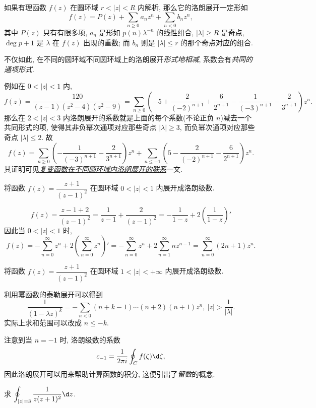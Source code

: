 如果有理函数 $f(z)$ 在圆环域 $r<|z|<R$ 内解析, 那么它的洛朗展开一定形如
\[f(z)=P(z)+\sum_{n\ge 0}a_n z^n+\sum_{n<0}b_n z^n,\]
其中 $P(z)$ 只有有限多项, 
$a_n$ 是形如 $p(n)\lambda^{-n}$ 的线性组合, $|\lambda|\ge R$ 是奇点, $\deg p+1$ 是 $\lambda$ 在 $f(z)$ 出现的重数; 而 $b_n$ 则是 $|\lambda|\le r$ 的那个奇点对应的组合.

不仅如此, 在不同的圆环域不同圆环域上的洛朗展开{\itshape 形式地相减}, 系数会有\emph{共同的通项形式}.

例如在 $0<|z|<1$ 内,
\[f(z)=\frac{120}{(z-1)(z^2-4)(z^2-9)}=\sum_{n\ge 0}\left(-5+\frac2{(-2)^{n+1}}+\frac6{2^{n+1}}-\frac1{(-3)^{n+1}}-\frac2{3^{n+1}}\right)z^n.\]
那么在 $2<|z|<3$ 内洛朗展开的系数就是上面的每个系数(不论正负 $n$)减去一个共同形式的项, 使得其非负幂次通项对应那些奇点 $|\lambda|\ge 3$, 而负幂次通项对应那些奇点 $|\lambda|\le2$.
故
\[f(z)=\sum_{n\ge 0}\left(-\frac1{(-3)^{n+1}}-\frac2{3^{n+1}}\right)z^n+\sum_{n\le-1}\left(5-\frac2{(-2)^{n+1}}-\frac6{2^{n+1}}\right)z^n.\]
其证明可见\emph{\href{https://zhangshenxing.gitee.io/teaching/publications/袁志杰张神星2023 复变函数在不同圆环域内洛朗展开的联系.pdf}{复变函数在不同圆环域内洛朗展开的联系}}一文.

\begin{example}
	将函数 $f(z)=\dfrac{z+1}{(z-1)^2}$ 在圆环域 $0<|z|<1$ 内展开成洛朗级数.
\end{example}

\begin{solution}
	\[f(z)=\frac{z-1+2}{(z-1)^2}=\frac1{z-1}+\frac{2}{(z-1)^2}=-\frac1{1-z}+2\left(\frac1{1-z}\right)'\]
	{因此当 $0<|z|<1$ 时,
		\[f(z)=-\sum_{n=0}^\infty z^n+2\left(\sum_{n=0}^\infty z^n\right)'=-\sum_{n=0}^\infty z^n+2\sum_{n=1}^\infty nz^{n-1}
		=\sum_{n=0}^\infty(2n+1)z^n.\]}
\end{solution}

\begin{exercise}
	将函数 $f(z)=\dfrac{z+1}{(z-1)^2}$ 在圆环域 $1<|z|<+\infty$ 内展开成洛朗级数.
\end{exercise}

利用幂函数的泰勒展开可以得到
\[\frac1{(1-\lambda z)^k}=-\sum_{n<0}(n+k-1)\cdots(n+2)(n+1)z^n,\ |z|>\frac1{|\lambda|}.\]
实际上求和范围可以改成 $n\le -k$.

注意到当 $n=-1$ 时, 洛朗级数的系数
\[c_{-1}=\frac1{2\pi i}\oint_C f(\zeta)\d\zeta,\]
因此洛朗展开可以用来帮助计算函数的积分,
这便引出了\emph{留数}的概念.


\begin{example}
	求 $\displaystyle\oint_{|z|=3}\frac1{z(z+1)^2}\d z$.
\end{example}

